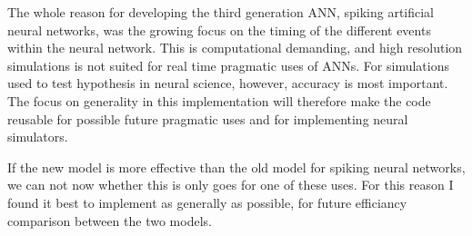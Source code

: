 The whole reason for developing the third generation ANN, spiking artificial neural networks, was the growing focus on the timing of the different events within the neural network.
This is computational demanding, and high resolution simulations is not suited for real time pragmatic uses of ANNs. For simulations used to test hypothesis in neural science, however, accuracy is most important.
The focus on generality in this implementation will therefore make the code reusable for possible future pragmatic uses and for implementing neural simulators.

If the new model is more effective than the old model for spiking neural networks, we can not now whether this is only goes for one of these uses. 
For this reason I found it best to implement as generally as possible, for future efficiancy comparison between the two models.



